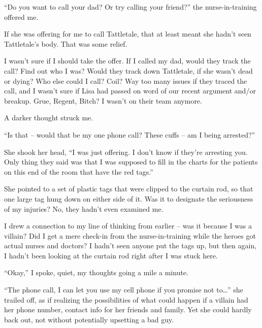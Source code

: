 ``Do you want to call your dad?  Or try calling your friend?'' the nurse-in-training offered me.



If she was offering for me to call Tattletale, that at least meant she hadn't seen Tattletale's body.  That was some relief.



I wasn't sure if I should take the offer.  If I called my dad, would they track the call?  Find out who I was?  Would they track down Tattletale, if she wasn't dead or dying?  Who else could I call?  Coil?  Way too many issues if they traced the call, and I wasn't sure if Lisa had passed on word of our recent argument and/or breakup.  Grue, Regent, Bitch?  I wasn't on their team anymore.



A darker thought struck me.



``Is that – would that be my one phone call?  These cuffs – am I being arrested?''



She shook her head, ``I was just offering.  I don't know if they're arresting you.  Only thing they said was that I was supposed to fill in the charts for the patients on this end of the room that have the red tags.''



She pointed to a set of plastic tags that were clipped to the curtain rod, so that one large tag hung down on either side of it.  Was it to designate the seriousness of my injuries?  No, they hadn't even examined me.



I drew a connection to my line of thinking from earlier – was it because I was a villain?  Did I get a mere check-in from the nurse-in-training while the heroes got actual nurses and doctors?  I hadn't seen anyone put the tags up, but then again, I hadn't been looking at the curtain rod right after I was stuck here.



``Okay,'' I spoke, quiet, my thoughts going a mile a minute.



``The phone call, I can let you use my cell phone if you promise not to\ldots'' she trailed off, as if realizing the possibilities of what could happen if a villain had her phone number, contact info for her friends and family.  Yet she could hardly back out, not without potentially upsetting a bad guy.



